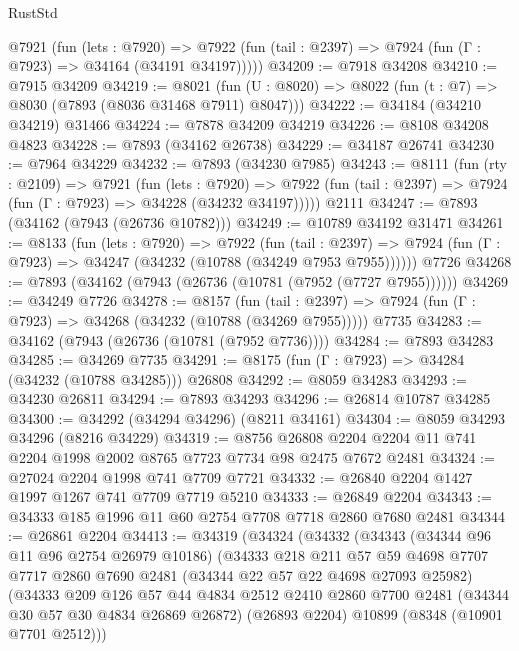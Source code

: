 \begin{lexlean}{RustStd}
\begin{coremodule}
    @7921
      (fun (lets : @7920) =>
      @7922 (fun (tail : @2397) => @7924 (fun (Γ : @7923) => @34164 (@34191 @34197)))))
@34209 := @7918 @34208
@34210 := @7915 @34209
@34219 := @8021
    (fun (U : @8020) => @8022 (fun (t : @7) => @8030 (@7893 (@8036 @31468 @7911) @8047)))
@34222 := @34184 (@34210 @34219) @31466
@34224 := @7878 @34209 @34219
@34226 := @8108 @34208 @4823
@34228 := @7893 (@34162 @26738)
@34229 := @34187 @26741
@34230 := @7964 @34229
@34232 := @7893 (@34230 @7985)
@34243 := @8111
    (fun (rty : @2109) =>
    @7921
      (fun (lets : @7920) =>
      @7922 (fun (tail : @2397) => @7924 (fun (Γ : @7923) => @34228 (@34232 @34197)))))
    @2111
@34247 := @7893 (@34162 (@7943 (@26736 @10782)))
@34249 := @10789 @34192 @31471
@34261 := @8133
    (fun (lets : @7920) =>
    @7922
      (fun (tail : @2397) =>
      @7924 (fun (Γ : @7923) => @34247 (@34232 (@10788 (@34249 @7953 @7955))))))
    @7726
@34268 := @7893 (@34162 (@7943 (@26736 (@10781 (@7952 (@7727 @7955))))))
@34269 := @34249 @7726
@34278 := @8157
    (fun (tail : @2397) => @7924 (fun (Γ : @7923) => @34268 (@34232 (@10788 (@34269 @7955)))))
    @7735
@34283 := @34162 (@7943 (@26736 (@10781 (@7952 @7736))))
@34284 := @7893 @34283
@34285 := @34269 @7735
@34291 := @8175 (fun (Γ : @7923) => @34284 (@34232 (@10788 @34285))) @26808
@34292 := @8059 @34283
@34293 := @34230 @26811
@34294 := @7893 @34293
@34296 := @26814 @10787 @34285
@34300 := @34292 (@34294 @34296) (@8211 @34161)
@34304 := @8059 @34293 @34296 (@8216 @34229)
@34319 := @8756
    @26808
    @2204
    @2204
    @11
    @741
    @2204
    @1998
    @2002
    @8765
    @7723
    @7734
    @98
    @2475
    @7672
    @2481
@34324 := @27024 @2204 @1998 @741 @7709 @7721
@34332 := @26840 @2204 @1427 @1997 @1267 @741 @7709 @7719 @5210
@34333 := @26849 @2204
@34343 := @34333 @185 @1996 @11 @60 @2754 @7708 @7718 @2860 @7680 @2481
@34344 := @26861 @2204
@34413 := @34319
    (@34324
      (@34332
        (@34343
          (@34344 @96 @11 @96 @2754 @26979 @10186)
          (@34333
            @218
            @211
            @57
            @59
            @4698
            @7707
            @7717
            @2860
            @7690
            @2481
            (@34344 @22 @57 @22 @4698 @27093 @25982)
            (@34333
              @209
              @126
              @57
              @44
              @4834
              @2512
              @2410
              @2860
              @7700
              @2481
              (@34344 @30 @57 @30 @4834 @26869 @26872)
              (@26893 @2204)
              @10899
              (@8348 (@10901 @7701 @2512)))

\end{coremodule}
\end{lexlean}

